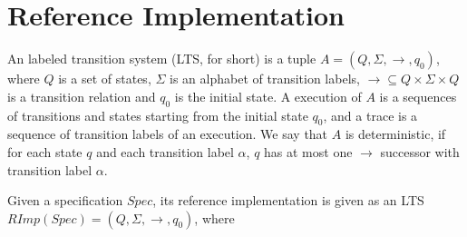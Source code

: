 
\section{Reference Implementation}
\label{sec:reference implementation}


An labeled transition system (LTS, for short) is a tuple $A = (Q,\Sigma,\rightarrow,q_0)$, where $Q$ is a set of states, $\Sigma$ is an alphabet of transition labels, $\rightarrow \subseteq Q \times \Sigma \times Q$ is a transition relation and $q_0$ is the initial state. A execution of $A$ is a sequences of transitions and states starting from the initial state $q_0$, and a trace is a sequence of transition labels of an execution. We say that $A$ is deterministic, if for each state $q$ and each transition label $\alpha$, $q$ has at most one $\rightarrow$ successor with transition label $\alpha$.

Given a specification $Spec$, its reference implementation is given as an LTS $RImp(Spec) = (Q,\Sigma,\rightarrow,q_0)$, where


